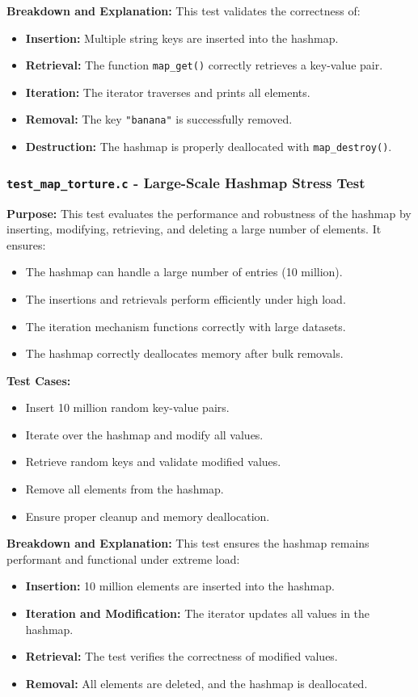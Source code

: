 \documentclass[titlepage]{article}
\begin{document}
\textbf{Breakdown and Explanation:}
This test validates the correctness of:
\begin{itemize}
    \item \textbf{Insertion:} Multiple string keys are inserted into the hashmap.
    \item \textbf{Retrieval:} The function \texttt{map\_get()} correctly retrieves a key-value pair.
    \item \textbf{Iteration:} The iterator traverses and prints all elements.
    \item \textbf{Removal:} The key \texttt{"banana"} is successfully removed.
    \item \textbf{Destruction:} The hashmap is properly deallocated with \texttt{map\_destroy()}.
\end{itemize}

\subsubsection{\texttt{test\_map\_torture.c} - Large-Scale Hashmap Stress Test}

\textbf{Purpose:}
This test evaluates the performance and robustness of the hashmap by inserting, modifying, retrieving, and deleting a large number of elements. It ensures:
\begin{itemize}
    \item The hashmap can handle a large number of entries (10 million).
    \item The insertions and retrievals perform efficiently under high load.
    \item The iteration mechanism functions correctly with large datasets.
    \item The hashmap correctly deallocates memory after bulk removals.
\end{itemize}

\textbf{Test Cases:}
\begin{itemize}
    \item Insert 10 million random key-value pairs.
    \item Iterate over the hashmap and modify all values.
    \item Retrieve random keys and validate modified values.
    \item Remove all elements from the hashmap.
    \item Ensure proper cleanup and memory deallocation.
\end{itemize}
\textbf{Breakdown and Explanation:}
This test ensures the hashmap remains performant and functional under extreme load:
\begin{itemize}
    \item \textbf{Insertion:} 10 million elements are inserted into the hashmap.
    \item \textbf{Iteration and Modification:} The iterator updates all values in the hashmap.
    \item \textbf{Retrieval:} The test verifies the correctness of modified values.
    \item \textbf{Removal:} All elements are deleted, and the hashmap is deallocated.
\end{itemize}
\end{document}

